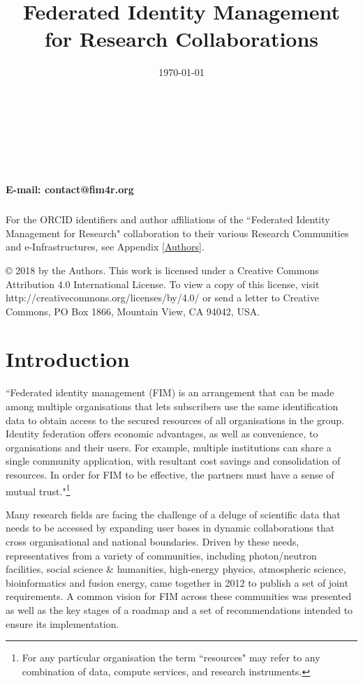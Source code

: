 \documentclass[fleqn,10pt]{wlscirep}
\title{Federated Identity Management for Research Collaborations}
\date{\today}
\begin{document}
\flushbottom


\maketitle

\thispagestyle{empty}

\noindent \\ \\ \\ \\ {\textbf{E-mail: contact@fim4r.org} \\  \\ For the ORCID{\textsuperscript{\textregistered}} identifiers and author affiliations of the ``Federated Identity Management for Research" collaboration to their various Research Communities and e-Infrastructures, see Appendix \ref{Authors}.
\newline
\newline
{}
\newline

\vfill

\noindent © 2018 by the Authors. This work is licensed under a Creative Commons Attribution 4.0 International License. To view a copy of this license, visit http://creativecommons.org/licenses/by/4.0/ or send a letter to Creative Commons, PO Box 1866, Mountain View, CA 94042, USA.

\newpage
\tableofcontents
\newpage
\section{Introduction}
``Federated identity management (FIM) is an arrangement that can be made among multiple organisations that lets subscribers use the same identification data to obtain access to the secured resources of all organisations in the group. Identity federation offers economic advantages, as well as convenience, to organisations and their users. For example, multiple institutions can share a single community application, with resultant cost savings and consolidation of resources. In order for FIM to be effective, the partners must have a sense of mutual trust."\cite{FIM4Rv1:2012}\footnote{For any particular organisation the term ``resources" may refer to any combination of data, compute services, and research instruments.} 

Many research fields are facing the challenge of a deluge of scientific data that needs to be accessed by expanding user bases in dynamic collaborations that cross organisational and national boundaries. Driven by these needs, representatives from a variety of communities, including photon/neutron facilities, social science \& humanities, high-energy physics, atmospheric science, bioinformatics and fusion energy, came together in 2012 to publish a set of joint requirements. A common vision for FIM across these communities was presented as well as the key stages of a roadmap and a set of recommendations intended to ensure its implementation. 

}
\end{document}
